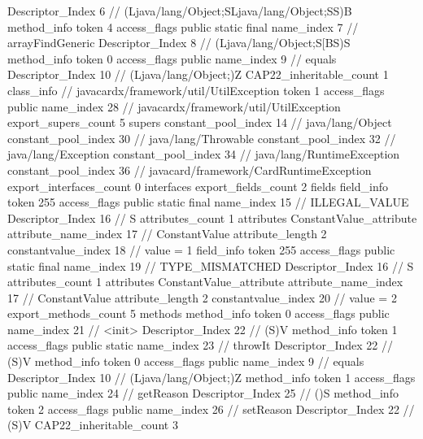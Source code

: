 {{{{{					Descriptor_Index	6		// (Ljava/lang/Object;SLjava/lang/Object;SS)B
				}
				method_info {
					token	4
					access_flags	public static final
					name_index	7		// arrayFindGeneric
					Descriptor_Index	8		// (Ljava/lang/Object;S[BS)S
				}
				method_info {
					token	0
					access_flags	public
					name_index	9		// equals
					Descriptor_Index	10		// (Ljava/lang/Object;)Z
				}
			}
			CAP22_inheritable_count	1
		}
		class_info {		// javacardx/framework/util/UtilException
			token	1
			access_flags	public
			name_index	28		// javacardx/framework/util/UtilException
			export_supers_count	5
			supers {
				constant_pool_index	14		// java/lang/Object
				constant_pool_index	30		// java/lang/Throwable
				constant_pool_index	32		// java/lang/Exception
				constant_pool_index	34		// java/lang/RuntimeException
				constant_pool_index	36		// javacard/framework/CardRuntimeException
			}
			export_interfaces_count	0
			interfaces {
			}
			export_fields_count	2
			fields {
			field_info {
				token	255
				access_flags	public static final
				name_index	15		// ILLEGAL_VALUE
				Descriptor_Index	16		// S
				attributes_count	1
				attributes {
				ConstantValue_attribute {
					attribute_name_index	17		// ConstantValue
					attribute_length	2
					constantvalue_index	18		// value = 1
				}
				}
			}
			field_info {
				token	255
				access_flags	public static final
				name_index	19		// TYPE_MISMATCHED
				Descriptor_Index	16		// S
				attributes_count	1
				attributes {
				ConstantValue_attribute {
					attribute_name_index	17		// ConstantValue
					attribute_length	2
					constantvalue_index	20		// value = 2
				}
				}
			}
			}
			export_methods_count	5
			methods {
				method_info {
					token	0
					access_flags	public
					name_index	21		// <init>
					Descriptor_Index	22		// (S)V
				}
				method_info {
					token	1
					access_flags	public static
					name_index	23		// throwIt
					Descriptor_Index	22		// (S)V
				}
				method_info {
					token	0
					access_flags	public
					name_index	9		// equals
					Descriptor_Index	10		// (Ljava/lang/Object;)Z
				}
				method_info {
					token	1
					access_flags	public
					name_index	24		// getReason
					Descriptor_Index	25		// ()S
				}
				method_info {
					token	2
					access_flags	public
					name_index	26		// setReason
					Descriptor_Index	22		// (S)V
				}
			}
			CAP22_inheritable_count	3
		}
	}
}
